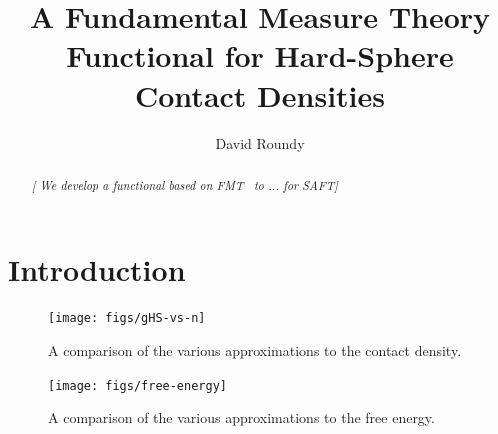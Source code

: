 \documentclass[letterpaper,twocolumn,amsmath,amssymb,prb]{revtex4-1}
\newcommand{\needsworklater}[1]{\emph{[#1]}}
\begin{document}
\title{A Fundamental Measure Theory Functional for Hard-Sphere Contact Densities}

\author{David Roundy}

\begin{abstract}
\needsworklater{ We develop a functional based on FMT~\cite{roth2002whitebear}
 to ... for SAFT}
\end{abstract}

\maketitle

\section{Introduction}


\begin{figure}
\texttt{[image: figs/gHS-vs-n]}
\caption{A comparison of the various approximations to the contact
  density.}
\label{fig:gHS-vs-n}
\end{figure}

\begin{figure}
\texttt{[image: figs/free-energy]}
\caption{A comparison of the various approximations to the free energy.}
\label{fig:free-energy}
\end{figure}
\end{document}
